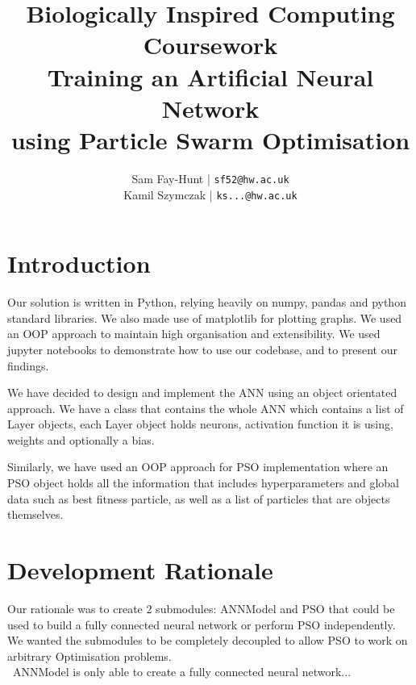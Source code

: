 \documentclass[11pt]{article}
\begin{document}
\title{%
	\bf Biologically Inspired Computing\\ 
    \large Coursework \\
    Training an Artificial Neural Network\\
     using Particle Swarm Optimisation}

\author{
	Sam Fay-Hunt | \texttt{sf52@hw.ac.uk}\\
	Kamil Szymczak | \texttt{ks...@hw.ac.uk}
}

\maketitle
\thispagestyle{empty}
\pagebreak

\tableofcontents
\thispagestyle{empty}
\pagebreak


\setcounter{page}{1}

\section{Introduction}
Our solution is written in Python, relying heavily on numpy, pandas and python standard libraries. We also made use of matplotlib for plotting graphs.
We used an OOP approach to maintain high organisation and extensibility.
We used jupyter notebooks to demonstrate how to use our codebase, and to present our findings. 

We have decided to design and implement the ANN using an object orientated approach. We have a class that contains the whole ANN which contains a list of Layer objects, each Layer object holds neurons, activation function it is using, weights and optionally a bias.

Similarly, we have used an OOP approach for PSO implementation where an PSO object holds all the information that includes hyperparameters and global data such as best fitness particle, as well as a list of particles that are objects themselves.

\section{Development Rationale}
Our rationale was to create 2 submodules: ANNModel and PSO that could be used to build a fully connected neural network or perform PSO independently.
We wanted the submodules to be completely decoupled to allow PSO to work on arbitrary Optimisation problems.\\

\noindent~ANNModel is only able to create a fully connected neural network...\\
\end{document}

